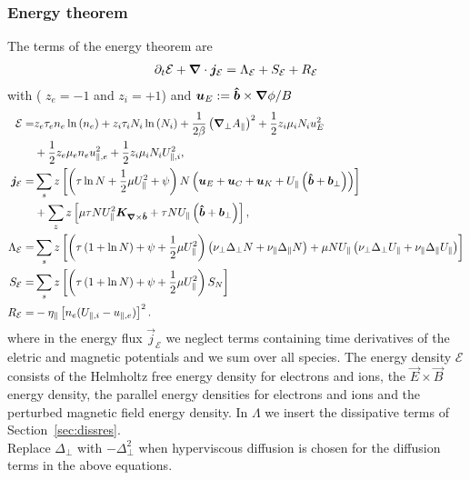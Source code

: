 \subsubsection{Energy theorem}
The terms of the energy theorem are
\begin{align} \label{eq:energy_theorem}
\partial_t \mathcal E +
{\boldsymbol{\nabla}}\cdot {\boldsymbol{j}}_{\mathcal E}
= \Lambda_{\mathcal E}
+  S_{\mathcal E}
+  R_{\mathcal E}
\end{align}
with ( $z_e=-1$ and $z_i=+1$) and ${\boldsymbol{u}}_E := {\bm{\hat{b}}\times {\boldsymbol{\nabla}}\phi}/{B}$
\begin{align} \label{eq:energy_conservation}
  \mathcal{E}= & z_e\tau_e n_e \ln{(n_e)} +z_i\tau_i N_i\ln{(N_i)}
  +\frac{1}{2\beta}\left({\boldsymbol{\nabla}}_{\perp} A_\parallel\right)^2
   +  \frac{1}{2} z_i \mu_i N_i u_E^2  \nonumber\\
   & +\frac{1}{2} z_e\mu_e  n_e u_{\parallel,e}^2
  +\frac{1}{2} z_i\mu_i  N_i U_{\parallel,i}^2,\\
  {\boldsymbol{j}}_{\mathcal E} =& \sum_s z\left[
  \left(\tau \ln N + \frac{1}{2}\mu U_\parallel^2 + \psi \right)N\left(
  {\boldsymbol{u}}_E + {\boldsymbol{u}}_C + {\boldsymbol{u}}_{K} +U_\parallel\left(\bm{\hat{b}}+{{\boldsymbol{b}}}_\perp\right)  \right) \right]
  \nonumber\\
  &+ \sum_z z\left[\mu \tau NU_\parallel^2{\boldsymbol{K}}_{{\boldsymbol{\nabla}}\times\bm{\hat{b}}} + \tau NU_\parallel \left(\bm{\hat{b}} + {{\boldsymbol{b}}}_\perp\right)\right], \\
  \Lambda_{\mathcal E} =&  \sum_s z\left[\left( \tau\left( 1+\ln{N}\right) + \psi + \frac{1}{2} \mu U_\parallel^2 \right)
  \left(\nu_\perp\Delta_\perp N + \nu_\parallel\Delta_\parallel N\right)  +  \mu NU_\parallel\left(\nu_\perp\Delta_\perp U_\parallel + \nu_\parallel\Delta_\parallel U_\parallel\right) \right]
\nonumber \\
  S_{\mathcal E} =&  \sum_s  z\left[ \left(\tau\left( 1+\ln{N}\right) +\psi + \frac{1}{2} \mu U_\parallel^2 \right)S_{N}\right]
\nonumber \\
  R_{\mathcal E} =&  -\eta_\parallel  \left[ n_e(U_{\parallel,i}-u_{\parallel,e})\right]^2.
\end{align}
where in the energy flux $\vec j_{\mathcal E}$
we neglect terms  containing time derivatives
of the eletric and magnetic potentials and we sum over all species.
The energy density $\mathcal E$ consists of the Helmholtz free energy density for electrons and ions,
the \(\vec{E} \times \vec{B}\) energy density, the parallel energy densities for electrons and ions and the perturbed magnetic field energy density.
In \(\Lambda\) we insert the dissipative terms of Section~\ref{sec:dissres}. \\
Replace $\Delta_\perp$ with $-\Delta_\perp^2$ when hyperviscous diffusion is chosen
for the diffusion terms in the above equations.

